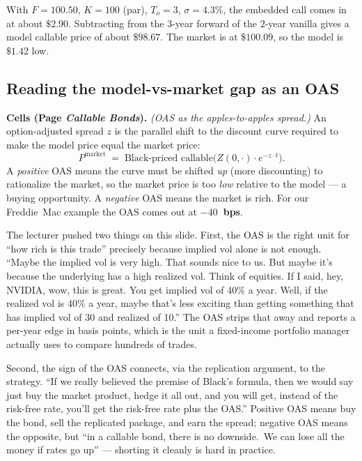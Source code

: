 With $F = 100.50$, $K = 100$ (par), $T_o = 3$, $\sigma = 4.3\%$, the
embedded call comes in at about $\$2.90$. Subtracting from the
$3$-year forward of the $2$-year vanilla gives a model callable price
of about $\$98.67$. The market is at $\$100.09$, so the model is
$\$1.42$ low.

\subsection{Reading the model-vs-market gap as an OAS}\label{L6-sec:freddie-oas}

\begin{keyblock}
\textbf{Cells (Page \emph{Callable Bonds}).}
\emph{(OAS as the apples-to-apples spread.)} An option-adjusted spread
$z$ is the parallel shift to the discount curve required to make the
model price equal the market price:
\[
  P^{\text{market}} \;=\; \text{Black-priced callable}\bigl(Z(0,\cdot)
       \cdot e^{-z\cdot t}\bigr).
\]
A \emph{positive} OAS means the curve must be shifted \emph{up} (more
discounting) to rationalize the market, so the market price is too
\emph{low} relative to the model --- a buying opportunity. A
\emph{negative} OAS means the market is rich. For our Freddie~Mac
example the OAS comes out at \textbf{$-40$~bps}.
\end{keyblock}

The lecturer pushed two things on this slide. First, the OAS is the
right unit for ``how rich is this trade'' precisely because implied
vol alone is not enough. ``Maybe the implied vol is very high. That
sounds nice to us. But maybe it's because the underlying has a high
realized vol. Think of equities. If I said, hey, NVIDIA, wow, this is
great. You get implied vol of 40\% a year. Well, if the realized vol
is 40\% a year, maybe that's less exciting than getting something
that has implied vol of 30 and realized of 10.'' The OAS strips that
away and reports a per-year edge in basis points, which is the unit a
fixed-income portfolio manager actually uses to compare hundreds of
trades.

Second, the sign of the OAS connects, via the replication argument,
to the strategy. ``If we really believed the premise of Black's
formula, then we would say just buy the market product, hedge it all
out, and you will get, instead of the risk-free rate, you'll get the
risk-free rate plus the OAS.'' Positive OAS means buy the bond, sell
the replicated package, and earn the spread; negative OAS means the
opposite, but ``in a callable bond, there is no downside.\ We can lose
all the money if rates go up'' --- shorting it cleanly is hard in
practice.

